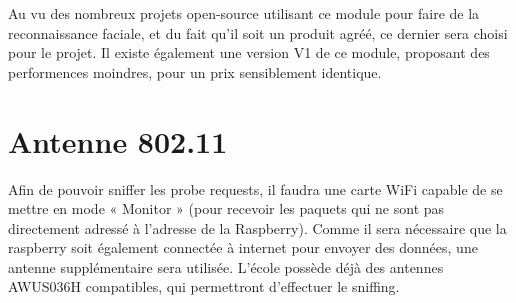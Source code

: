 \begin{table}[H]
    \caption{\label{tab:etude-marche-picamera}Spécification du module PiCaméra}
\end{table}

Au vu des nombreux projets open-source utilisant ce module pour faire de la reconnaissance faciale, et du fait qu’il
soit un produit agréé, ce dernier sera choisi pour le projet. Il existe également une version V1 de ce module,
proposant des performences moindres, pour un prix sensiblement identique.

\section{Antenne 802.11}

Afin de pouvoir sniffer les probe requests, il faudra une carte WiFi capable de se mettre en mode « Monitor » (pour
recevoir les paquets qui ne sont pas directement adressé à l’adresse de la Raspberry). Comme il sera nécessaire
que la raspberry soit également connectée à internet pour envoyer des données, une antenne supplémentaire sera
utilisée. L’école possède déjà des antennes AWUS036H compatibles, qui permettront d’effectuer le sniffing.



